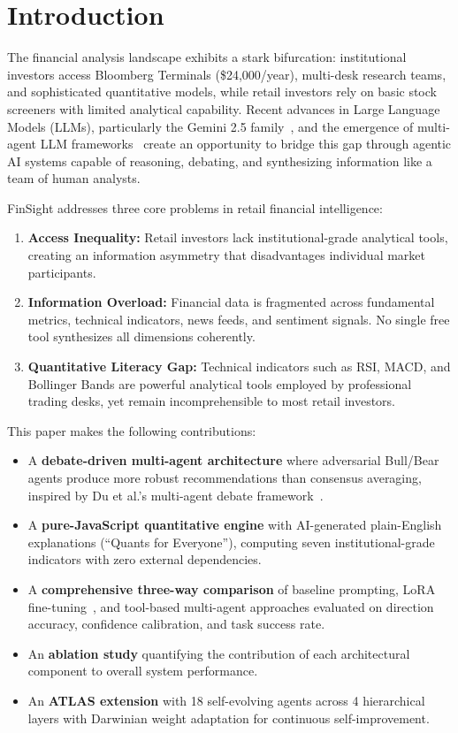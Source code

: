 \documentclass[conference]{IEEEtran}
\begin{document}
\section{Introduction}
\label{sec:intro}

The financial analysis landscape exhibits a stark bifurcation: institutional investors access Bloomberg Terminals (\$24,000/year), multi-desk research teams, and sophisticated quantitative models, while retail investors rely on basic stock screeners with limited analytical capability. Recent advances in Large Language Models (LLMs), particularly the Gemini 2.5 family~\cite{google2025gemini}, and the emergence of multi-agent LLM frameworks~\cite{guo2024llmmultiagents, chen2024multiagentsurvey} create an opportunity to bridge this gap through agentic AI systems capable of reasoning, debating, and synthesizing information like a team of human analysts.

FinSight addresses three core problems in retail financial intelligence:

\begin{enumerate}
\item \textbf{Access Inequality:} Retail investors lack institutional-grade analytical tools, creating an information asymmetry that disadvantages individual market participants.
\item \textbf{Information Overload:} Financial data is fragmented across fundamental metrics, technical indicators, news feeds, and sentiment signals. No single free tool synthesizes all dimensions coherently.
\item \textbf{Quantitative Literacy Gap:} Technical indicators such as RSI, MACD, and Bollinger Bands are powerful analytical tools employed by professional trading desks, yet remain incomprehensible to most retail investors.
\end{enumerate}

This paper makes the following contributions:

\begin{itemize}
\item A \textbf{debate-driven multi-agent architecture} where adversarial Bull/Bear agents produce more robust recommendations than consensus averaging, inspired by Du et al.'s multi-agent debate framework~\cite{du2023debate}.
\item A \textbf{pure-JavaScript quantitative engine} with AI-generated plain-English explanations (``Quants for Everyone''), computing seven institutional-grade indicators with zero external dependencies.
\item A \textbf{comprehensive three-way comparison} of baseline prompting, LoRA fine-tuning~\cite{hu2021lora}, and tool-based multi-agent approaches evaluated on direction accuracy, confidence calibration, and task success rate.
\item An \textbf{ablation study} quantifying the contribution of each architectural component to overall system performance.
\item An \textbf{ATLAS extension} with 18 self-evolving agents across 4 hierarchical layers with Darwinian weight adaptation for continuous self-improvement.
\end{itemize}
\end{document}
